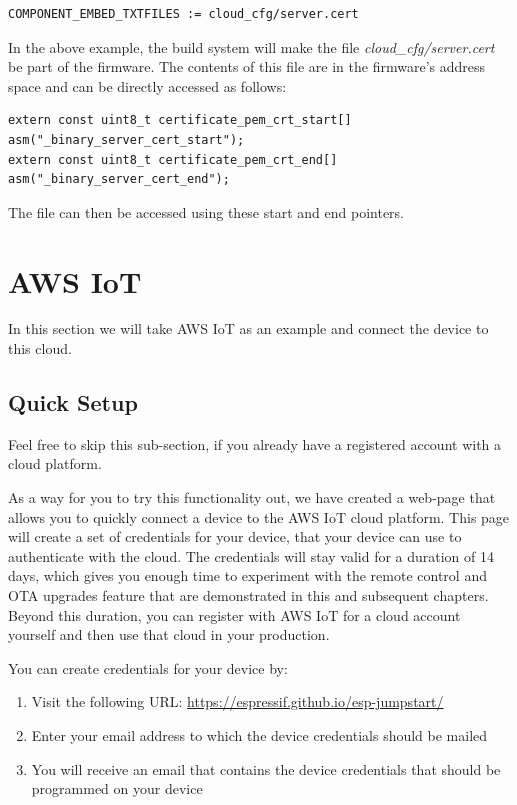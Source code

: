 \documentclass[main.tex]{subfiles}
\begin{document}
\begin{verbatim}
COMPONENT_EMBED_TXTFILES := cloud_cfg/server.cert 
\end{verbatim}

In the above example, the build system will make the file \textit{cloud\_cfg/server.cert} be part of the firmware. The contents of this file are in the firmware's address space and can be directly accessed as follows:
\begin{verbatim}
extern const uint8_t certificate_pem_crt_start[] asm("_binary_server_cert_start");
extern const uint8_t certificate_pem_crt_end[] asm("_binary_server_cert_end");
\end{verbatim}

The file can then be accessed using these start and end pointers.

\section{AWS IoT}\label{sec:aws_cloud}
In this section we will take AWS IoT as an example and connect the device to this cloud. 

\subsection{Quick Setup}

Feel free to skip this sub-section, if you already have a registered account with a cloud platform.

As a way for you to try this functionality out, we have created a web-page that allows you to quickly connect a device to the AWS IoT cloud platform. This page will create a set of credentials for your device, that your device can use to authenticate with the cloud. The credentials will stay valid for a duration of 14 days, which gives you enough time to experiment with the remote control and OTA upgrades feature that are demonstrated in this and subsequent chapters. Beyond this duration, you can register with AWS IoT for a cloud account yourself and then use that cloud in your production.

You can create credentials for your device by:
\begin{enumerate}
   \item Visit the following URL: \url{https://espressif.github.io/esp-jumpstart/}
   \item Enter your email address to which the device credentials should be mailed
   \item You will receive an email that contains the device credentials that should be programmed on your device
\end{enumerate}
\end{document}
